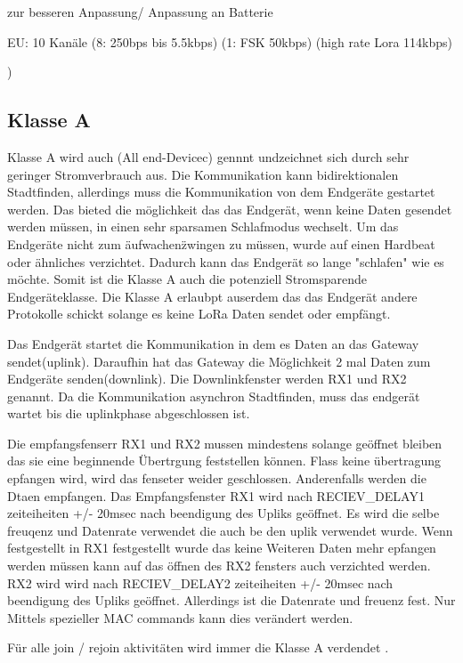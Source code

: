 \documentclass[a4paper,12pt]{article}
\begin{document}
        zur besseren Anpassung/ Anpassung an Batterie
        
        EU: 10 Kanäle (8: 250bps bis 5.5kbps) (1: FSK 50kbps) (high rate Lora 114kbps)

        )
        \subsection{Klasse A}\label{sec:ClassA}
            Klasse A wird auch (All end-Devicec) gennnt undzeichnet sich durch sehr geringer Stromverbrauch aus. Die Kommunikation kann bidirektionalen Stadtfinden, allerdings muss die Kommunikation von dem Endgeräte gestartet werden. Das bieted die möglichkeit das das Endgerät, wenn keine Daten gesendet werden müssen, in einen sehr
            sparsamen Schlafmodus wechselt. Um das Endgeräte nicht zum \"aufwachen\" zwingen zu müssen, wurde auf einen Hardbeat oder ähnliches verzichtet. Dadurch kann das Endgerät so lange "schlafen" wie es möchte. Somit ist die Klasse A auch die potenziell Stromsparende Endgeräteklasse. 
            Die Klasse A erlaubpt auserdem das das Endgerät andere Protokolle schickt solange es keine LoRa Daten sendet oder empfängt.
            
            Das Endgerät startet die Kommunikation in dem es Daten an das Gateway sendet(uplink). Daraufhin hat das Gateway die Möglichkeit 2 mal Daten zum Endgeräte senden(downlink). Die Downlinkfenster werden RX1 und RX2 genannt.
            Da die Kommunikation asynchron Stadtfinden, muss das endgerät wartet bis die uplinkphase abgeschlossen ist.

            Die empfangsfenserr RX1 und RX2 mussen mindestens solange geöffnet bleiben das sie eine beginnende Übertrgung feststellen können. Flass keine übertragung epfangen wird, wird das fenseter weider geschlossen. Anderenfalls werden die Dtaen empfangen.
            Das Empfangsfenster RX1 wird nach RECIEV\_DELAY1 zeiteiheiten +/- 20msec nach beendigung des Upliks geöffnet. Es wird die selbe freuqenz und Datenrate verwendet die auch be den uplik verwendet wurde.
            Wenn festgestellt in RX1 festgestellt wurde das keine Weiteren Daten mehr epfangen werden müssen kann auf das öffnen des RX2 fensters auch verzichted werden.
            RX2 wird wird nach RECIEV\_DELAY2 zeiteiheiten +/- 20msec nach beendigung des Upliks geöffnet. Allerdings ist die Datenrate und freuenz fest. Nur Mittels spezieller MAC commands kann dies verändert werden.
            
            Für alle join / rejoin aktivitäten wird immer die Klasse A verdendet .
\end{document}
